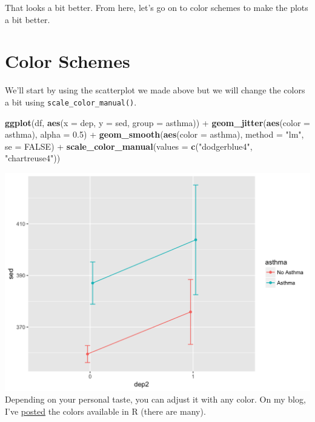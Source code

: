 \documentclass[]{tufte-book}
\newenvironment{Shaded}{}{}
\newcommand{\KeywordTok}[1]{\textcolor[rgb]{0.00,0.44,0.13}{\textbf{#1}}}
\newcommand{\DataTypeTok}[1]{\textcolor[rgb]{0.56,0.13,0.00}{#1}}
\newcommand{\FloatTok}[1]{\textcolor[rgb]{0.25,0.63,0.44}{#1}}
\newcommand{\StringTok}[1]{\textcolor[rgb]{0.25,0.44,0.63}{#1}}
\newcommand{\OtherTok}[1]{\textcolor[rgb]{0.00,0.44,0.13}{#1}}
\newcommand{\OperatorTok}[1]{\textcolor[rgb]{0.40,0.40,0.40}{#1}}
\newcommand{\NormalTok}[1]{#1}
\theoremstyle{definition}
\theoremstyle{definition}
\theoremstyle{remark}
\begin{document}
That looks a bit better. From here, let's go on to color schemes to make
the plots a bit better.

\section*{Color Schemes}\label{color-schemes}

We'll start by using the scatterplot we made above but we will change
the colors a bit using \texttt{scale\_color\_manual()}.

\begin{Shaded}
\begin{Highlighting}[]
\KeywordTok{ggplot}\NormalTok{(df, }\KeywordTok{aes}\NormalTok{(}\DataTypeTok{x =}\NormalTok{ dep, }\DataTypeTok{y =}\NormalTok{ sed, }\DataTypeTok{group =}\NormalTok{ asthma)) }\OperatorTok{+}\StringTok{ }
\StringTok{    }\KeywordTok{geom_jitter}\NormalTok{(}\KeywordTok{aes}\NormalTok{(}\DataTypeTok{color =}\NormalTok{ asthma), }\DataTypeTok{alpha =} \FloatTok{0.5}\NormalTok{) }\OperatorTok{+}\StringTok{ }
\StringTok{    }\KeywordTok{geom_smooth}\NormalTok{(}\KeywordTok{aes}\NormalTok{(}\DataTypeTok{color =}\NormalTok{ asthma), }\DataTypeTok{method =} \StringTok{"lm"}\NormalTok{, }
        \DataTypeTok{se =} \OtherTok{FALSE}\NormalTok{) }\OperatorTok{+}\StringTok{ }\KeywordTok{scale_color_manual}\NormalTok{(}\DataTypeTok{values =} \KeywordTok{c}\NormalTok{(}\StringTok{"dodgerblue4"}\NormalTok{, }
    \StringTok{"chartreuse4"}\NormalTok{))}
\end{Highlighting}
\end{Shaded}

\includegraphics{_main_files/figure-latex/unnamed-chunk-143-1} Depending
on your personal taste, you can adjust it with any color. On my blog,
I've \href{https:/tysonstanley.github.io}{posted} the colors available
in R (there are many).
\end{document}
